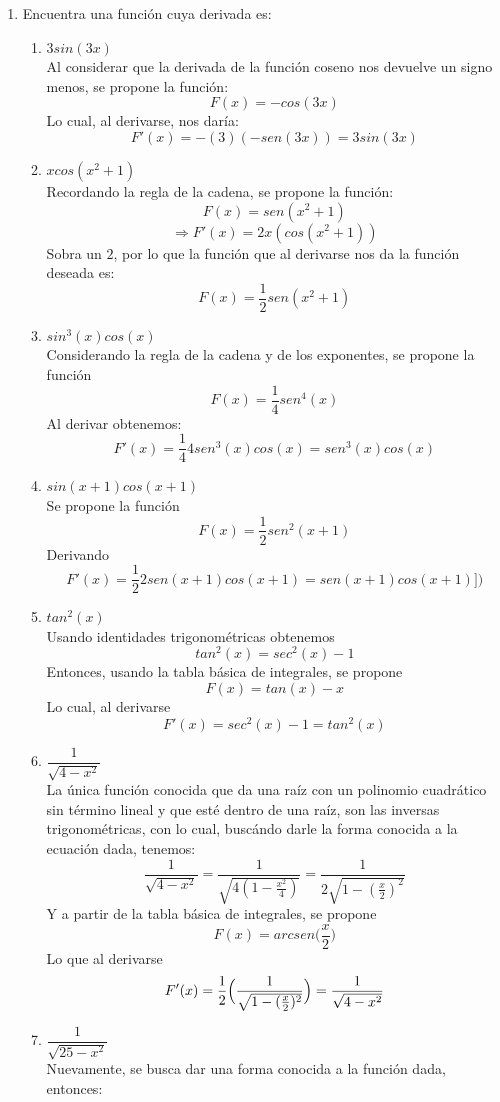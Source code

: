 \documentclass[12pt]{article}
\begin{document}
\begin{enumerate}
\begin{center}
		\end{center}
		\item Encuentra una función cuya derivada es:
		\begin{enumerate}
			\item $3 sin(3x)$\\	
			Al considerar que la derivada de la función coseno nos devuelve un signo menos, se propone la función:\\
			 \[F(x)= -cos(3x)\]
			Lo cual, al derivarse, nos daría: 
			\[F'(x)=-(3)(-sen(3x))=3sin(3x)\]
			\item $x cos(x^2+1)$\\
			Recordando la regla de la cadena, se propone la función:
			\[F(x)=sen(x^2+1) \]
			\[ \Rightarrow F'(x)=2x(cos(x^2+1))\]
			Sobra un $2$, por lo que la función que al derivarse nos da la función deseada es:
			\[F(x)= \frac{1}{2}sen(x^2+1) \]
			\item $sin^3(x)cos(x)$\\
			Considerando la regla de la cadena y de los exponentes, se propone la función
			\[F(x)=\frac{1}{4}sen^4(x)\]
			Al derivar obtenemos:
			\[F'(x)=\frac{1}{4}4sen^3(x)cos(x)=sen^3(x)cos(x)\]
			\item $sin(x+1)cos(x+1)$\\
			Se propone la función\[F(x)=\frac{1}{2}sen^2(x+1)\]
			Derivando \[F'(x)=\frac{1}{2}2sen(x+1)cos(x+1)=sen(x+1)cos(x+1)])\]
			\item $tan^2(x)$\\
			Usando identidades trigonométricas obtenemos
			\[tan^2(x)=sec^2(x)-1 \]
			Entonces, usando la tabla básica de integrales, se propone
			\[F(x)=tan(x)-x\]
			Lo cual, al derivarse
			\[F'(x)=sec^2(x)-1=tan^2(x)\]
			\item $\dfrac{1}{\sqrt{4-x^2}}$\\
			La única función conocida que da una raíz con un polinomio cuadrático sin término lineal y que esté dentro de una raíz, son las inversas trigonométricas, con lo cual, buscándo darle la forma conocida a la ecuación dada, tenemos:
			\[\dfrac{1}{\sqrt{4-x^2}}=\dfrac{1}{\sqrt{4(1-\frac{x^2}{4})}}=\dfrac{1}{2\sqrt{1-(\frac{x}{2})^2}}\]
			Y a partir de la tabla básica de integrales, se propone
			\[F(x)=arcsen\bigl(\frac{x}{2}\bigr)\]
			Lo que al derivarse
			\[F'(x)=\frac{1}{2}\Bigl(\dfrac{1}{\sqrt{1-(\frac{x}{2})^2}}\Bigr)=\dfrac{1}{\sqrt{4-x^2}}\]
			\item $\dfrac{1}{\sqrt{25-x^2}}$\\
			Nuevamente, se busca dar una forma conocida a la función dada, entonces:

\end{enumerate}
\end{enumerate}
\end{document}
